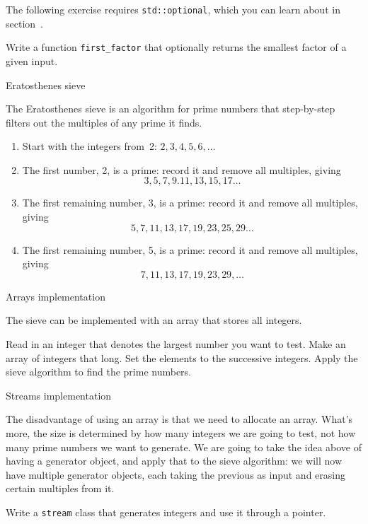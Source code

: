 The following exercise requires \lstinline+std::optional+,
which you can learn about in section~.

\begin{exercise}
  \label{ex:primeoptfact}
  Write a function \lstinline+first_factor+ that optionally
  returns the smallest factor of a given input.
\end{exercise}

 {Eratosthenes sieve}

The Eratosthenes sieve is an algorithm for prime numbers that
step-by-step filters out the multiples of any prime it finds.
\begin{enumerate}
\item Start with the integers from~2: $2,3,4,5,6,\ldots$
\item The first number, 2, is a prime: record it and remove all
  multiples, giving
  \[ 3,5,7,9.11,13,15,17\dots \]
\item The first remaining number, 3, is a prime: record it and remove
  all multiples, giving
  \[ 5,7,11,13,17,19,23,25,29\ldots \]
\item The first remaining number, 5, is a prime: record it and remove
  all multiples, giving
  \[ 7,11,13,17,19,23,29,\ldots \]
\end{enumerate}

 {Arrays implementation}
\label{sec:arraysieve}

The sieve can be implemented with an array that stores all integers.

\begin{exercise}
  \label{ex:arraysieve}
  Read in an integer that denotes the largest number you want to test.
  Make an array of integers that long. Set the elements to the
  successive integers. Apply the sieve algorithm to find the prime numbers.
\end{exercise}

 {Streams implementation}
\label{sec:streamsieve}

The disadvantage of using an array is that we need to allocate
an array. What's more, the size is determined by how many integers we
are going to test, not how many prime numbers we want to generate.
We are going to take the idea above of having a generator object, and
apply that to the sieve algorithm: we will now have multiple generator
objects, each taking the previous as input and erasing certain
multiples from it.

\begin{exercise}
  Write a \lstinline{stream} class that generates integers and use it through
  a pointer.
\end{exercise}

